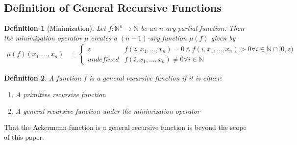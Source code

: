 \documentclass[12pt, letterpaper]{article}
\newtheorem*{definition}{Definition}
\theoremstyle{case}
\begin{document}
    \subsection{Definition of General Recursive Functions}
    \begin{definition}[Minimization]
      Let $f: \mathbb{N}^n \rightarrow \mathbb{N}$ be an $n$-ary partial function. Then the minimization operator $\mu$
      creates a $(n - 1)$-ary function $\mu(f)$ given by
      \begin{equation*}
        \begin{aligned}
          \mu(f)(x_1, ..., x_n) &=
          \begin{cases}
            z                       & f(z, x_1, ..., x_n) = 0 \wedge f(i, x_1, ..., x_n) > 0 \forall i \in \mathbb{N} \cap [0, z) \\
            undefined               & f(i, x_1, ..., x_n) \neq 0 \forall i \in \mathbb{N}
          \end{cases}
        \end{aligned}
      \end{equation*}
    \end{definition}
    \begin{definition}
      A function $f$ is a general recursive function if it is either:
      \begin{enumerate}
        \item A primitive recursive function
        \item A general recursive function under the minimization operator
      \end{enumerate}
    \end{definition}
  That the Ackermann function is a general recursive function is beyond the scope of this paper.
\end{document}
